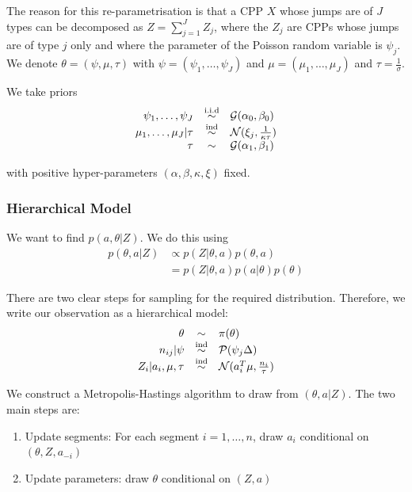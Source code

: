 \documentclass[a4paper,11pt]{article}
\theoremstyle{theorem}
\theoremstyle{definition}
\theoremstyle{remark}
\begin{document}
The reason for this re-parametrisation is that a CPP $X$ whose jumps are of $J$ types can be decomposed as $Z = \sum_{j=1}^{J}{Z_j}$, where the $Z_j$ are CPPs whose jumps are of type $j$ only and where the parameter of the Poisson random variable is $\psi_j$.
We denote $\theta = (\psi, \mu, \tau)$ with $\psi = (\psi_1, \dotsc, \psi_J)$ and $\mu = (\mu_1, \dotsc, \mu_J)$ and $\tau = \frac{1}{\sigma}$.

We take priors
\[
\begin{array}{r c l}
\psi_1, \dotsc, \psi_J & \overset{\text{i.i.d}}{\sim} & \mathcal{G}(\alpha_0, \beta_0) \\
\mu_1, \dotsc, \mu_J | \tau & \overset{\text{ind}}{\sim} & \mathcal{N}(\xi_j, \frac{1}{\kappa\tau}) \\
\tau & \sim & \mathcal{G}(\alpha_1, \beta_1)
\end{array}
\]

with positive hyper-parameters $(\alpha, \beta, \kappa, \xi)$ fixed.

\subsubsection{Hierarchical Model}

We want to find $p(a, \theta | Z)$. We do this using 
\begin{align*}
p(\theta, a | Z) &\propto p(Z | \theta, a)p(\theta, a) \\
&= p(Z | \theta, a)p(a | \theta)p(\theta)
\end{align*}

There are two clear steps for sampling for the required distribution. Therefore, we write our observation as a hierarchical model:
\[
\begin{array}{r c l}
\theta & \sim & \pi(\theta) \\
n_{ij} | \psi & \overset{\text{ind}}{\sim} & \mathcal{P}(\psi_j \Delta) \\
Z_i | a_i, \mu, \tau & \overset{\text{ind}}{\sim} & \mathcal{N}(a_{i}^{T} \mu, \frac{n_i}{\tau})
\end{array}
\]

We construct a Metropolis-Hastings algorithm to draw from $(\theta, a | Z)$. The two main steps are:
\begin{enumerate}
\item Update segments: For each segment $i = 1, \dotsc, n$, draw $a_i$ conditional on $(\theta, Z, a_{-i})$
\item Update parameters: draw $\theta$ conditional on $(Z, a)$
\end{enumerate}
 
\end{document}
